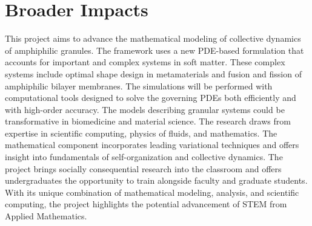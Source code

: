 \section{Broader Impacts}
\label{sec:BroaderImpacts}
This project aims to advance the mathematical modeling of collective
dynamics of amphiphilic granules. The framework uses a new PDE-based
formulation that accounts for important and complex systems in soft
matter. These complex systems include optimal shape design in
metamaterials and fusion and fission of amphiphilic bilayer membranes.
The simulations will be performed with computational tools designed to
solve the governing PDEs both efficiently and with high-order accuracy.
The models describing granular systems could be transformative in
biomedicine and material science. The research draws from expertise in
scientific computing, physics of fluids, and mathematics. The
mathematical component incorporates leading variational techniques and
offers insight into fundamentals of self-organization and collective
dynamics. The project brings socially consequential research into the
classroom and offers undergraduates the opportunity to train alongside
faculty and graduate students. With its unique combination of
mathematical modeling, analysis, and scientific computing, the project
highlights the potential advancement of STEM from Applied Mathematics.

